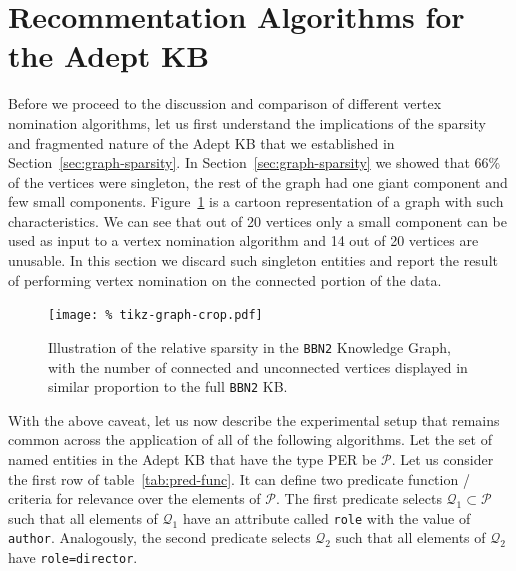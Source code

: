 \documentclass[paper=a4,fontsize=11pt]{scrartcl}
\newcommand{\Secref}[1]{Section~\ref{#1}}
\newcommand{\tabref}[1]{table~\ref{#1}}
\newcommand{\Figref}[1]{Figure~\ref{#1}}
\numberwithin{equation}{section}    %
\numberwithin{figure}{section}      %
\numberwithin{table}{section}       %
\begin{document}
\section{Recommentation Algorithms for the Adept KB}
\label{sec:er-algorithms}
Before we proceed to the discussion and comparison of different vertex
nomination algorithms, let us first understand the implications of the sparsity
and fragmented nature of the Adept KB that we established in
\Secref{sec:graph-sparsity}.  In \Secref{sec:graph-sparsity} we showed that
$66\%$ of the vertices were singleton, the rest of the graph had one giant
component and few small components.  \Figref{fig:adept-cartoon} is a cartoon
representation of a graph with such characteristics.  We can see that out of 20
vertices only a small component can be used as input to a vertex nomination
algorithm and 14 out of 20 vertices are unusable. In this section we discard
such singleton entities and report the result of performing vertex nomination on
the connected portion of the data.
\begin{figure}[htbp]
  \centering
  \texttt{[image: \%
    tikz-graph-crop.pdf]}
  \caption{Illustration of the relative sparsity in the \texttt{BBN2} Knowledge Graph, with the number of connected and unconnected vertices displayed in similar proportion to the full \texttt{BBN2} KB.}
  \label{fig:adept-cartoon}
\end{figure}
With the above caveat, let us now describe the experimental setup
that remains common across the application of all of the following
algorithms. Let the set of named entities in
the Adept KB that have the type \textsc{PER} be $\mathcal{P}$.  Let us consider
the first row of \tabref{tab:pred-func}.  It can define two predicate function /
criteria for relevance over the elements of $\mathcal{P}$.  The first predicate
selects $\mathcal{Q_1} \subset \mathcal{P}$ such that all elements of
$\mathcal{Q_1}$ have an attribute called \texttt{role} with the value of
\texttt{author}.  Analogously, the second predicate selects $\mathcal{Q}_2$ such
that all elements of $\mathcal{Q}_2$ have \texttt{role=director}.
\end{document}
